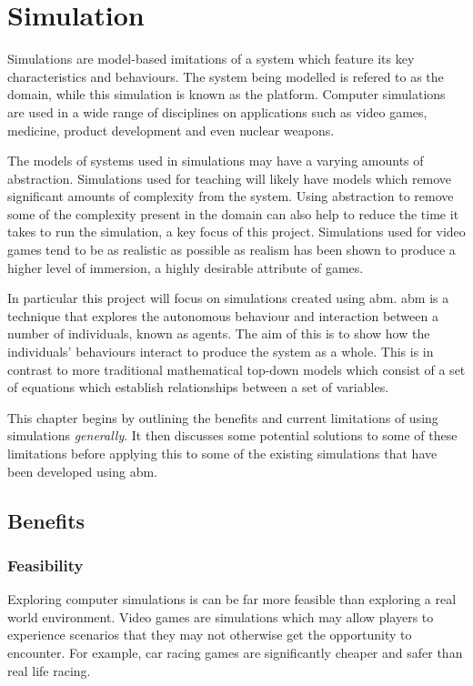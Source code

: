 \documentclass{UoYCSproject}
\begin{document}
\section{Simulation}
\label{simulation}
Simulations are model-based imitations of a system which feature its key characteristics and behaviours.
The system being modelled is refered to as the domain, while this simulation is known as the platform.
Computer simulations are used in a wide range of disciplines on applications such as video games, medicine, product development and even nuclear weapons.

The models of systems used in simulations may have a varying amounts of abstraction.
Simulations used for teaching will likely have models which remove significant amounts of complexity from the system.
Using abstraction to remove some of the complexity present in the domain can also help to reduce the time it takes to run the simulation, a key focus of this project.
Simulations used for video games tend to be as realistic as possible as realism has been shown to produce a higher level of immersion\cite{realism_immersion}, a highly desirable attribute of games.

In particular this project will focus on simulations created using \acrfull{abm}.
\gls{abm} is a technique that explores the autonomous behaviour and interaction between a number of individuals, known as agents.
The aim of this is to show how the individuals' behaviours interact to produce the system as a whole.
This is in contrast to more traditional mathematical top-down models which consist of a set of equations which establish relationships between a set of variables.

This chapter begins by outlining the benefits and current limitations of using simulations \textit{generally}.
It then discusses some potential solutions to some of these limitations before applying this to some of the existing simulations that have been developed using \gls{abm}.

\subsection{Benefits}
\subsubsection{Feasibility}
Exploring computer simulations is can be far more feasible than exploring a real world environment.
Video games are simulations which may allow players to experience scenarios that they may not otherwise get the opportunity to encounter.
For example, car racing games are significantly cheaper and safer than real life racing.
\end{document}
